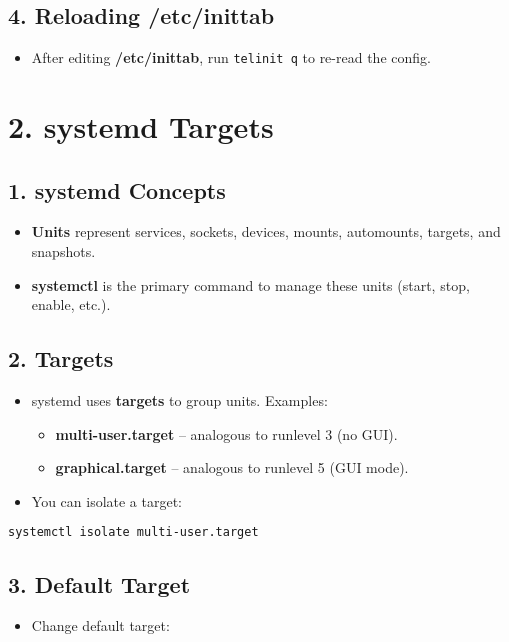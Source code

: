 \documentclass[a4paper]{report}
\begin{document}
\subsection*{4. Reloading \textbf{/etc/inittab}}
\begin{itemize}
    \item After editing \textbf{/etc/inittab}, run \texttt{telinit q} to re-read the config.
\end{itemize}

\section*{2. systemd Targets}

\subsection*{1. systemd Concepts}
\begin{itemize}
    \item \textbf{Units} represent services, sockets, devices, mounts, automounts, targets, and snapshots.
    \item \textbf{systemctl} is the primary command to manage these units (start, stop, enable, etc.).
\end{itemize}

\subsection*{2. Targets}
\begin{itemize}
    \item systemd uses \textbf{targets} to group units. Examples:
    \begin{itemize}
        \item \textbf{multi-user.target} – analogous to runlevel 3 (no GUI).
        \item \textbf{graphical.target} – analogous to runlevel 5 (GUI mode).
    \end{itemize}
    \item You can isolate a target:
\end{itemize}

\begin{lstlisting}[language=bash]
systemctl isolate multi-user.target
\end{lstlisting}

\subsection*{3. Default Target}
\begin{itemize}
    \item Change default target:
\end{itemize}
\end{document}
